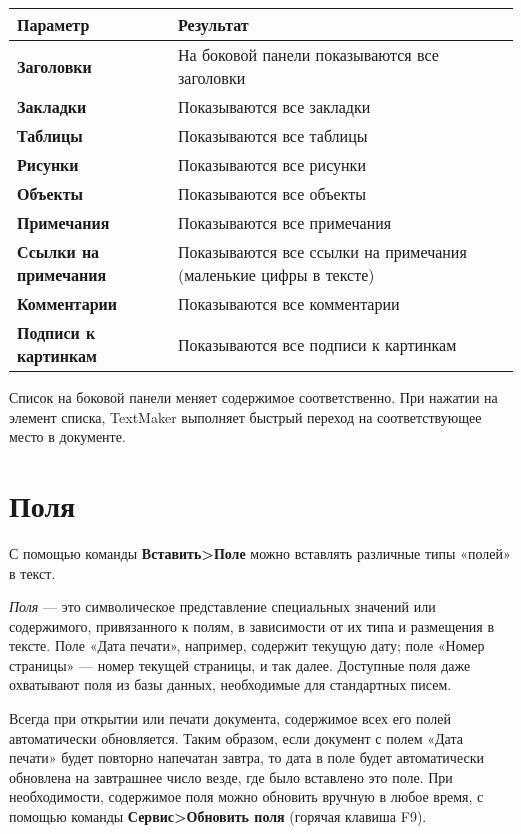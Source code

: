 ﻿\documentclass[a4paper,10pt]{article}
\begin{document}
\begin{center}
\begin{tabular}{ | m{5cm} | m{9cm} | }
\hline
 \textbf{Параметр} & \textbf{Результат} \\ 
 \hline
 \textbf{Заголовки} & На боковой панели показываются все заголовки\\
\hline
\textbf{Закладки} & Показываются все закладки\\
\hline
\textbf{Таблицы} & Показываются все таблицы\\
\hline
\textbf{Рисунки} & Показываются все рисунки\\
\hline
\textbf{Объекты} & Показываются все объекты\\
\hline
\textbf{Примечания} & Показываются все примечания\\
\hline
\textbf{Ссылки на примечания} & Показываются все ссылки на примечания (маленькие цифры в тексте)\\
\hline
\textbf{Комментарии} & Показываются все комментарии\\
\hline
\textbf{Подписи к картинкам} & Показываются все подписи к картинкам\\
\hline
\end{tabular}
\end{center}

Список на боковой панели меняет содержимое соответственно. При нажатии на элемент списка, TextMaker выполняет быстрый переход на соответствующее место в документе.

\section{Поля} \label{sec:поля}
С помощью команды \textbf{Вставить>Поле} можно вставлять различные типы  «полей» в текст.

\textit{Поля} — это символическое представление специальных значений или содержимого, привязанного к полям, в зависимости от их типа и размещения в тексте. Поле «Дата печати», например, содержит текущую дату; поле «Номер страницы» — номер текущей страницы, и так далее. Доступные поля даже охватывают поля из базы данных, необходимые для стандартных писем.

Всегда при открытии или печати документа, содержимое всех его полей автоматически обновляется. Таким образом, если документ с полем «Дата печати» будет повторно напечатан завтра, то дата в поле будет автоматически обновлена на завтрашнее число везде, где было вставлено это поле. При необходимости, содержимое поля можно обновить вручную в любое время, с помощью команды \textbf{Сервис>Обновить поля} (горячая клавиша F9).
\end{document}
